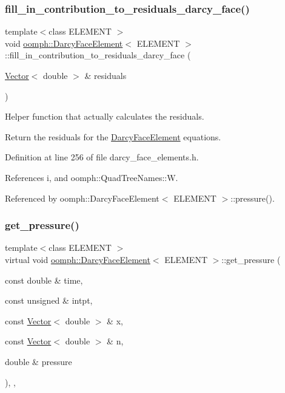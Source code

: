 \subsubsection{\texorpdfstring{fill\+\_\+in\+\_\+contribution\+\_\+to\+\_\+residuals\+\_\+darcy\+\_\+face()}{fill\_in\_contribution\_to\_residuals\_darcy\_face()}}
{\footnotesize\ttfamily template$<$class E\+L\+E\+M\+E\+NT $>$ \\
void \hyperlink{classoomph_1_1DarcyFaceElement}{oomph\+::\+Darcy\+Face\+Element}$<$ E\+L\+E\+M\+E\+NT $>$\+::fill\+\_\+in\+\_\+contribution\+\_\+to\+\_\+residuals\+\_\+darcy\+\_\+face (\begin{DoxyParamCaption}\item[{\hyperlink{classoomph_1_1Vector}{Vector}$<$ double $>$ \&}]{residuals }\end{DoxyParamCaption})\hspace{0.3cm}{\ttfamily [protected]}}



Helper function that actually calculates the residuals. 

Return the residuals for the \hyperlink{classoomph_1_1DarcyFaceElement}{Darcy\+Face\+Element} equations. 

Definition at line 256 of file darcy\+\_\+face\+\_\+elements.\+h.



References i, and oomph\+::\+Quad\+Tree\+Names\+::W.



Referenced by oomph\+::\+Darcy\+Face\+Element$<$ E\+L\+E\+M\+E\+N\+T $>$\+::pressure().

\mbox{\label{classoomph_1_1DarcyFaceElement_afedbc8695e027c9d1bb80843f2548bc1}} 
\subsubsection{\texorpdfstring{get\+\_\+pressure()}{get\_pressure()}}
{\footnotesize\ttfamily template$<$class E\+L\+E\+M\+E\+NT $>$ \\
virtual void \hyperlink{classoomph_1_1DarcyFaceElement}{oomph\+::\+Darcy\+Face\+Element}$<$ E\+L\+E\+M\+E\+NT $>$\+::get\+\_\+pressure (\begin{DoxyParamCaption}\item[{const double \&}]{time,  }\item[{const unsigned \&}]{intpt,  }\item[{const \hyperlink{classoomph_1_1Vector}{Vector}$<$ double $>$ \&}]{x,  }\item[{const \hyperlink{classoomph_1_1Vector}{Vector}$<$ double $>$ \&}]{n,  }\item[{double \&}]{pressure }\end{DoxyParamCaption})\hspace{0.3cm}{\ttfamily [inline]}, {\ttfamily [protected]}, {\ttfamily [virtual]}}



